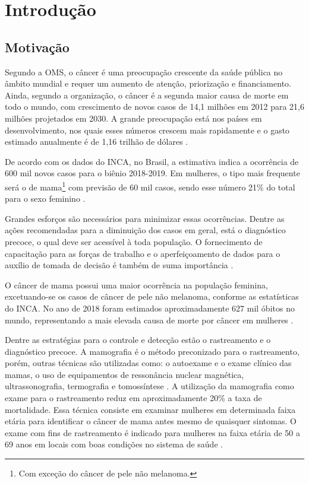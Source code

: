 \chapter[Introdução]{Introdução}\label{Introdução}


\section{Motivação}
Segundo a \ac{OMS}, o câncer é uma preocupação crescente da saúde pública no âmbito mundial e requer um aumento de atenção, priorização e financiamento. Ainda, segundo a organização, o câncer é a segunda maior causa de morte em todo o mundo, com crescimento de novos casos de 14,1 milhões em 2012 para 21,6 milhões projetados em 2030. A grande preocupação está nos países em desenvolvimento, nos quais esses números crescem mais rapidamente e o gasto estimado anualmente é de 1,16 trilhão de dólares \cite{oms}.

De acordo com os dados do \ac{INCA}, no Brasil, a estimativa indica a ocorrência de 600 mil novos casos para o biênio 2018-2019. Em mulheres, o tipo mais frequente será o de mama\footnote{ Com exceção do câncer de pele não melanoma.} com previsão de 60 mil casos, sendo esse número 21\% do total para o sexo feminino \cite{inca}.

Grandes esforços são necessários para minimizar essas ocorrências. Dentre as ações recomendadas para a diminuição dos casos em geral, está o diagnóstico precoce, o qual deve ser acessível à toda população. O fornecimento de capacitação para as forças de trabalho e o aperfeiçoamento de dados para o auxílio de tomada de decisão é também de suma importância \cite{oms}. 

O câncer de mama possui uma maior ocorrência na população feminina, excetuando-se os casos de câncer de pele não melanoma, conforme as estatísticas do \ac{INCA}. No ano de 2018 foram estimados aproximadamente 627 mil óbitos no mundo, representando a mais elevada causa de morte por câncer em mulheres \cite{oms}.

Dentre as estratégias para o controle e detecção estão o rastreamento e o diagnóstico precoce. A mamografia é o método preconizado para o rastreamento, porém, outras técnicas são utilizadas como: o autoexame e o exame clínico das mamas, o uso de equipamentos de ressonância nuclear magnética, ultrassonografia, termografia e tomossíntese \cite{inca}. A utilização da mamografia como exame para o rastreamento reduz em aproximadamente 20\% a taxa de mortalidade. Essa técnica consiste em examinar mulheres em determinada faixa etária para identificar o câncer de mama antes mesmo de quaisquer sintomas. O exame com fins de rastreamento é indicado para mulheres na faixa etária de 50 a 69 anos em locais com boas condições no sistema de saúde \cite{oms}.

